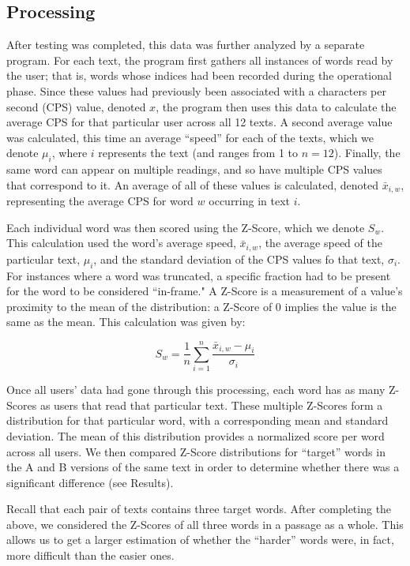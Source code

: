 \documentclass[11pt,letterpaper]{article}
\begin{document}
	\subsection{Processing}
	
	After testing was completed, this data was further analyzed by a separate program. For each text, the program first gathers all instances of words read by the user; that is, words whose indices had been recorded during the operational phase. Since these values had previously been associated with a characters per second (CPS) value, denoted $x$, the program then uses this data to calculate the average CPS for that particular user across all 12 texts. A second average value was calculated, this time an average ``speed'' for each of the texts, which we denote $\mu_i$, where $i$ represents the text (and ranges from 1 to $n=12$). Finally, the same word can appear on multiple readings, and so have multiple CPS values that correspond to it. An average of all of these values is calculated, denoted $\bar{x}_{i,w}$, representing the average CPS for word $w$ occurring in text $i$.
	
	Each individual word was then scored using the Z-Score, which we denote $S_w$. This calculation used the word's average speed, $\bar{x}_{i,w}$, the average speed of the particular text, $\mu_i$, and the standard deviation of the CPS values fo that text, $\sigma_i$. For instances where a word was truncated, a specific fraction had to be present for the word to be considered ``in-frame." A Z-Score is a measurement of a value's proximity to the mean of the distribution: a Z-Score of 0 implies the value is the same as the mean. This calculation was given by:
	
	\[ S_w = \frac1n \sum_{i=1}^n \frac{\bar{x}_{i,w} - \mu_i}{\sigma_i} \]
	
	Once all users' data had gone through this processing, each word has as many Z-Scores as users that read that particular text. These multiple Z-Scores form a distribution for that particular word, with a corresponding mean and standard deviation. The mean of this distribution provides a normalized score per word across all users. We then compared Z-Score distributions for ``target'' words in the A and B versions of the same text in order to determine whether there was a significant difference (see Results). 
	
	Recall that each pair of texts contains three target words. After completing the above, we considered the Z-Scores of all three words in a passage as a whole. This allows us to get a larger estimation of whether the ``harder'' words were, in fact, more difficult than the easier ones.
	
\end{document}
